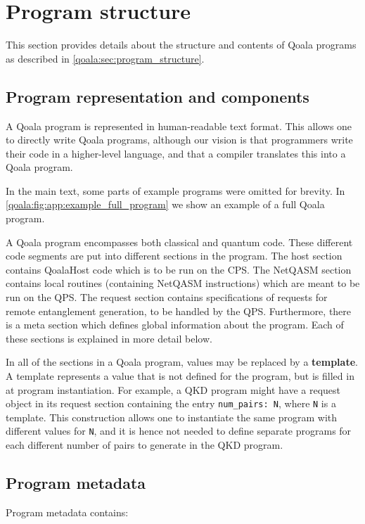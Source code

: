 \section{Program structure}
\label{qoala:sec:app:program_structure}
This section provides details about the structure and contents of Qoala programs as described in \cref{qoala:sec:program_structure}.


\subsection{Program representation and components}
A Qoala program is represented in human-readable text format.
This allows one to directly write Qoala programs, although our vision is that programmers write their code in a higher-level language, and that a compiler translates this into a Qoala program.

In the main text, some parts of example programs were omitted for brevity.
In \cref{qoala:fig:app:example_full_program} we show an example of a full Qoala program.

A Qoala program encompasses both classical and quantum code.
These different code segments are put into different sections in the program.
The host section contains QoalaHost code which is to be run on the CPS.
The NetQASM section contains local routines (containing NetQASM instructions) which are meant to be run on the QPS.
The request section contains specifications of requests for remote entanglement generation, to be handled by the QPS.
Furthermore, there is a meta section which defines global information about the program.
Each of these sections is explained in more detail below.

In all of the sections in a Qoala program, values may be replaced by a \textbf{template}.
A template represents a value that is not defined for the program, but is filled in at program instantiation. For example, a QKD program might have a request object in its request section containing the entry \texttt{num\_pairs: {N}}, where \texttt{{N}} is a template. This construction allows one to instantiate the same program with different values for \texttt{N}, and it is hence not needed to define separate programs for each different number of pairs to generate in the QKD program.

\subsection{Program metadata}
Program metadata contains:

